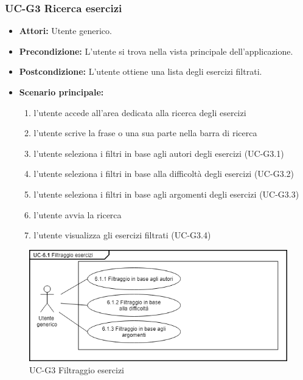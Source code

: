 	\subsubsection{UC-G3 Ricerca esercizi}
		\begin{itemize}
			\item\textbf{ Attori:} Utente generico.
			\item \textbf{Precondizione:} L'utente si trova nella vista principale dell'applicazione.
			\item \textbf{Postcondizione:} L'utente ottiene una lista degli esercizi filtrati.
			\item \textbf{Scenario principale:}
				\begin{enumerate}
					\item l'utente accede all'area dedicata alla ricerca degli esercizi
					\item l'utente scrive la frase o una sua parte nella barra di ricerca
					\item l'utente seleziona i filtri in base agli autori degli esercizi (UC-G3.1)
					\item l'utente seleziona i filtri in base alla difficoltà degli esercizi (UC-G3.2)
					\item l'utente seleziona i filtri in base agli argomenti degli esercizi (UC-G3.3)
					\item l'utente avvia la ricerca
					\item l'utente visualizza gli esercizi filtrati (UC-G3.4)
				\end{enumerate}
		\end{itemize}
		\begin{figure}[h]
			\centering
			\includegraphics[scale=0.7]{images/UC-6.png}
			\caption{UC-G3 Filtraggio esercizi}
		\end{figure}	

